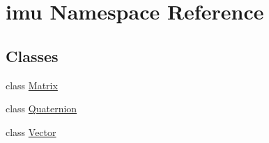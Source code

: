 \hypertarget{namespaceimu}{}\section{imu Namespace Reference}
\label{namespaceimu}
\subsection*{Classes}
\begin{DoxyCompactItemize}
\item 
class \hyperlink{classimu_1_1Matrix}{Matrix}
\item 
class \hyperlink{classimu_1_1Quaternion}{Quaternion}
\item 
class \hyperlink{classimu_1_1Vector}{Vector}
\end{DoxyCompactItemize}
